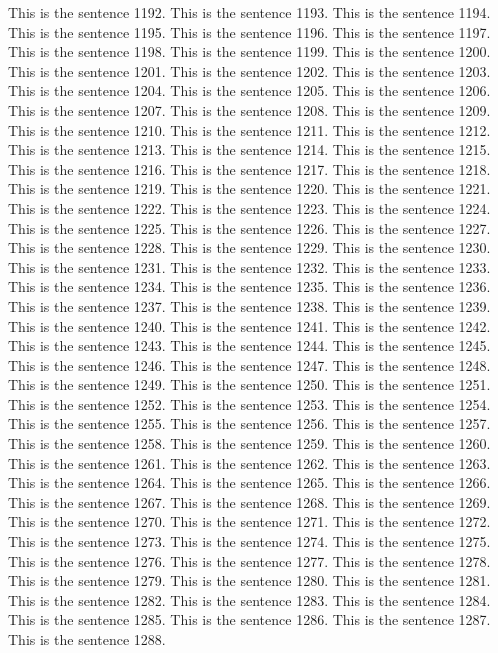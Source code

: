 \documentclass{article}
\begin{document}
This is the sentence 1192.
This is the sentence 1193.
This is the sentence 1194.
This is the sentence 1195.
This is the sentence 1196.
This is the sentence 1197.
This is the sentence 1198.
This is the sentence 1199.
This is the sentence 1200.
This is the sentence 1201.
This is the sentence 1202.
This is the sentence 1203.
This is the sentence 1204.
This is the sentence 1205.
This is the sentence 1206.
This is the sentence 1207.
This is the sentence 1208.
This is the sentence 1209.
This is the sentence 1210.
This is the sentence 1211.
This is the sentence 1212.
This is the sentence 1213.
This is the sentence 1214.
This is the sentence 1215.
This is the sentence 1216.
This is the sentence 1217.
This is the sentence 1218.
This is the sentence 1219.
This is the sentence 1220.
This is the sentence 1221.
This is the sentence 1222.
This is the sentence 1223.
This is the sentence 1224.
This is the sentence 1225.
This is the sentence 1226.
This is the sentence 1227.
This is the sentence 1228.
This is the sentence 1229.
This is the sentence 1230.
This is the sentence 1231.
This is the sentence 1232.
This is the sentence 1233.
This is the sentence 1234.
This is the sentence 1235.
This is the sentence 1236.
This is the sentence 1237.
This is the sentence 1238.
This is the sentence 1239.
This is the sentence 1240.
This is the sentence 1241.
This is the sentence 1242.
This is the sentence 1243.
This is the sentence 1244.
This is the sentence 1245.
This is the sentence 1246.
This is the sentence 1247.
This is the sentence 1248.
This is the sentence 1249.
This is the sentence 1250.
This is the sentence 1251.
This is the sentence 1252.
This is the sentence 1253.
This is the sentence 1254.
This is the sentence 1255.
This is the sentence 1256.
This is the sentence 1257.
This is the sentence 1258.
This is the sentence 1259.
This is the sentence 1260.
This is the sentence 1261.
This is the sentence 1262.
This is the sentence 1263.
This is the sentence 1264.
This is the sentence 1265.
This is the sentence 1266.
This is the sentence 1267.
This is the sentence 1268.
This is the sentence 1269.
This is the sentence 1270.
This is the sentence 1271.
This is the sentence 1272.
This is the sentence 1273.
This is the sentence 1274.
This is the sentence 1275.
This is the sentence 1276.
This is the sentence 1277.
This is the sentence 1278.
This is the sentence 1279.
This is the sentence 1280.
This is the sentence 1281.
This is the sentence 1282.
This is the sentence 1283.
This is the sentence 1284.
This is the sentence 1285.
This is the sentence 1286.
This is the sentence 1287.
This is the sentence 1288.
\end{document}
